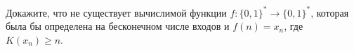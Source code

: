 Докажите, что не существует вычислимой функции $f: \{0, 1\}^* \to \{0, 1\}^*$, которая была бы определена
на бесконечном числе входов и $f(n) = x_n$, где $K(x_n) \ge n$.